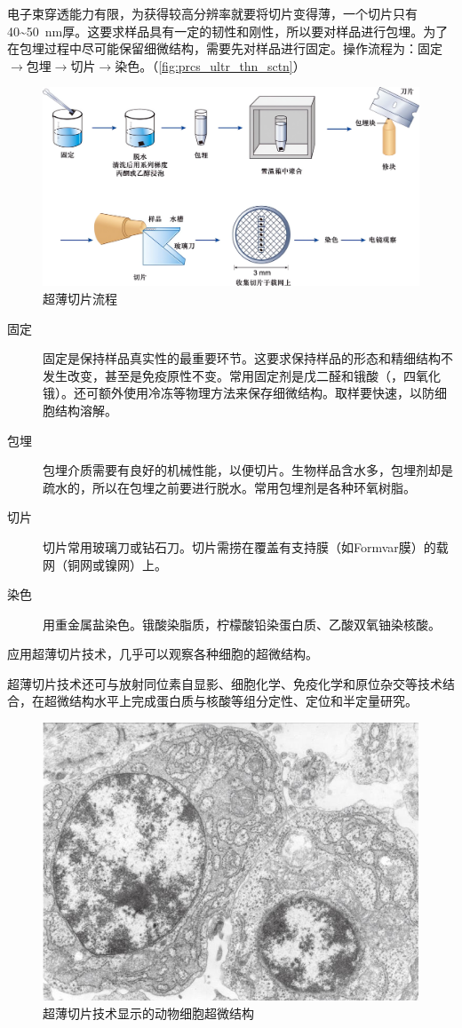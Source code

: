 电子束穿透能力有限，为获得较高分辨率就要将切片变得薄，一个切片只有40\textasciitilde\SI{50}{\nm}厚。这要求样品具有一定的韧性和刚性，所以要对样品进行包埋。为了在包埋过程中尽可能保留细微结构，需要先对样品进行固定。操作流程为：固定$\longrightarrow$包埋$\longrightarrow$切片$\longrightarrow$染色。（\autoref{fig:prcs_ultr_thn_sctn}）

\begin{figure}[htbp]
	\centering
	\includegraphics[width=\linewidth]{Pics/超薄切片流程}
	\caption{超薄切片流程}
	\label{fig:prcs_ultr_thn_sctn}
\end{figure}

\begin{description}
	\item[固定] 固定是保持样品真实性的最重要环节。这要求保持样品的形态和精细结构不发生改变，甚至是免疫原性不变。常用固定剂是戊二醛和锇酸（，四氧化锇）。还可额外使用冷冻等物理方法来保存细微结构。取样要快速，以防细胞结构溶解。
	\item[包埋] 包埋介质需要有良好的机械性能，以便切片。生物样品含水多，包埋剂却是疏水的，所以在包埋之前要进行脱水。常用包埋剂是各种环氧树脂。
	\item[切片] 切片常用玻璃刀或钻石刀。切片需捞在覆盖有支持膜（如Formvar膜）的载网（铜网或镍网）上。
	\item[染色] 用重金属盐染色。锇酸染脂质，柠檬酸铅染蛋白质、乙酸双氧铀染核酸。
\end{description}

应用超薄切片技术，几乎可以观察各种细胞的超微结构。

超薄切片技术还可与放射同位素自显影、细胞化学、免疫化学和原位杂交等技术结合，在超微结构水平上完成蛋白质与核酸等组分定性、定位和半定量研究。

\begin{figure}[htbp]
	\centering
	\includegraphics[width=0.5\linewidth]{Pics/超薄切片技术显示的动物细胞超微结构}
	\caption{超薄切片技术显示的动物细胞超微结构}
	\label{fig:ultrathinSectioningTechnologyShowingUltrastructureOfAnimalCells}
\end{figure}

